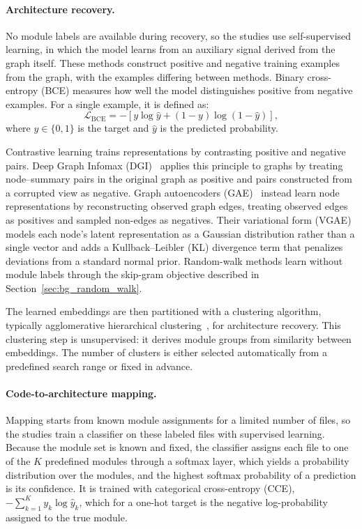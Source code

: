 \paragraph{Architecture recovery.} No module labels are available during recovery, so the studies use self-supervised learning, in which the model learns from an auxiliary signal derived from the graph itself. These methods construct positive and negative training examples from the graph, with the examples differing between methods. Binary cross-entropy (BCE) measures how well the model distinguishes positive from negative examples. For a single example, it is defined as:
\begin{equation}
    \mathcal{L}_{\mathrm{BCE}} = -\left[y\log\hat{y} + (1-y)\log(1-\hat{y})\right],
    \label{eq:bce}
\end{equation}
where $y \in \{0,1\}$ is the target and $\hat{y}$ is the predicted probability.

Contrastive learning trains representations by contrasting positive and negative pairs. Deep Graph Infomax (DGI)~\cite{dgi} applies this principle to graphs by treating node--summary pairs in the original graph as positive and pairs constructed from a corrupted view as negative. Graph autoencoders (GAE)~\cite{gae} instead learn node representations by reconstructing observed graph edges, treating observed edges as positives and sampled non-edges as negatives. Their variational form (VGAE)~\cite{gae} models each node's latent representation as a Gaussian distribution rather than a single vector and adds a Kullback--Leibler (KL) divergence term that penalizes deviations from a standard normal prior. Random-walk methods learn without module labels through the skip-gram objective described in Section~\ref{sec:bg_random_walk}.

The learned embeddings are then partitioned with a clustering algorithm, typically agglomerative hierarchical clustering~\cite{agglomerative}, for architecture recovery. This clustering step is unsupervised: it derives module groups from similarity between embeddings. The number of clusters is either selected automatically from a predefined search range or fixed in advance.

\paragraph{Code-to-architecture mapping.} Mapping starts from known module assignments for a limited number of files, so the studies train a classifier on these labeled files with supervised learning. Because the module set is known and fixed, the classifier assigns each file to one of the $K$ predefined modules through a softmax layer, which yields a probability distribution over the modules, and the highest softmax probability of a prediction is its confidence. It is trained with categorical cross-entropy (CCE), $-\sum_{k=1}^{K} y_k\log\hat{y}_k$, which for a one-hot target is the negative log-probability assigned to the true module.

